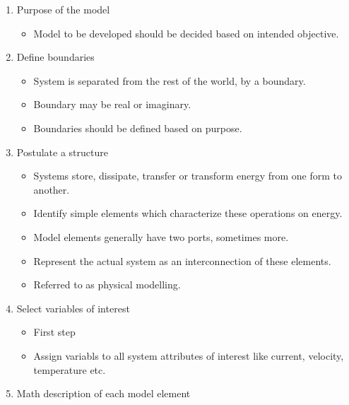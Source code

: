 \documentclass[11pt]{report}
\begin{document}
\begin{enumerate}
\item Purpose of the model

\begin{itemize}
\item Model to be developed should be decided based on intended
objective.
\end{itemize}

\item Define boundaries

\begin{itemize}
\item System is separated from the rest of the world, by a boundary.

\item Boundary may be real or imaginary.

\item Boundaries should be defined based on purpose.
\end{itemize}

\item Postulate a structure

\begin{itemize}
\item Systems store, dissipate, transfer or transform energy from one
form to another.

\item Identify simple elements which characterize these operations on
energy.

\item Model elements generally have two ports, sometimes more.

\item Represent the actual system as an interconnection of these
elements.

\item Referred to as physical modelling.
\end{itemize}

\item Select variables of interest

\begin{itemize}
\item First step

\item Assign variabls to all system attributes of interest like current,
velocity, temperature etc.
\end{itemize}

\item Math description of each model element


\end{enumerate}
\end{document}
